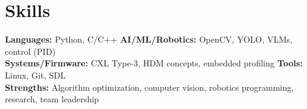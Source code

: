 \documentclass[10pt,letterpaper]{article}
\begin{document}
\section*{Skills}
\textbf{Languages:} Python, C/C++ \qquad
\textbf{AI/ML/Robotics:} OpenCV, YOLO, VLMs, control (PID) \\
\textbf{Systems/Firmware:} CXL Type-3, HDM concepts, embedded profiling \qquad
\textbf{Tools:} Linux, Git, SDL \\
\textbf{Strengths:} Algorithm optimization, computer vision, robotics programming, research, team leadership
\end{document}
